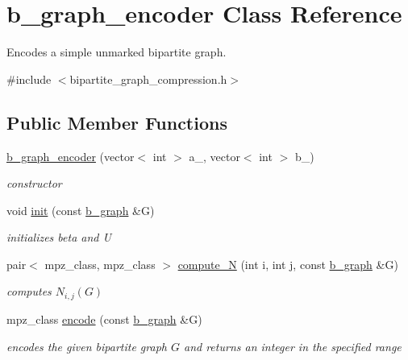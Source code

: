 \hypertarget{classb__graph__encoder}{}\section{b\+\_\+graph\+\_\+encoder Class Reference}
\label{classb__graph__encoder}


Encodes a simple unmarked bipartite graph.  




{\ttfamily \#include $<$bipartite\+\_\+graph\+\_\+compression.\+h$>$}

\subsection*{Public Member Functions}
\begin{DoxyCompactItemize}
\item 
\hyperlink{classb__graph__encoder_a77b8fc4f060a8ef159583f1cfa35f283}{b\+\_\+graph\+\_\+encoder} (vector$<$ int $>$ a\+\_\+, vector$<$ int $>$ b\+\_\+)
\begin{DoxyCompactList}\small\item\em constructor \end{DoxyCompactList}\item 
void \hyperlink{classb__graph__encoder_a9b62ac0580191ac42b98d764046af7cb}{init} (const \hyperlink{classb__graph}{b\+\_\+graph} \&G)
\begin{DoxyCompactList}\small\item\em initializes beta and U \end{DoxyCompactList}\item 
pair$<$ mpz\+\_\+class, mpz\+\_\+class $>$ \hyperlink{classb__graph__encoder_a3ffcfb945e8563d01e683fc5e5127d6d}{compute\+\_\+N} (int i, int j, const \hyperlink{classb__graph}{b\+\_\+graph} \&G)
\begin{DoxyCompactList}\small\item\em computes $N_{i,j}(G)$ \end{DoxyCompactList}\item 
mpz\+\_\+class \hyperlink{classb__graph__encoder_a9dbf40f42a2eb12822b14ca10d580763}{encode} (const \hyperlink{classb__graph}{b\+\_\+graph} \&G)
\begin{DoxyCompactList}\small\item\em encodes the given bipartite graph $G$ and returns an integer in the specified range \end{DoxyCompactList}\end{DoxyCompactItemize}
